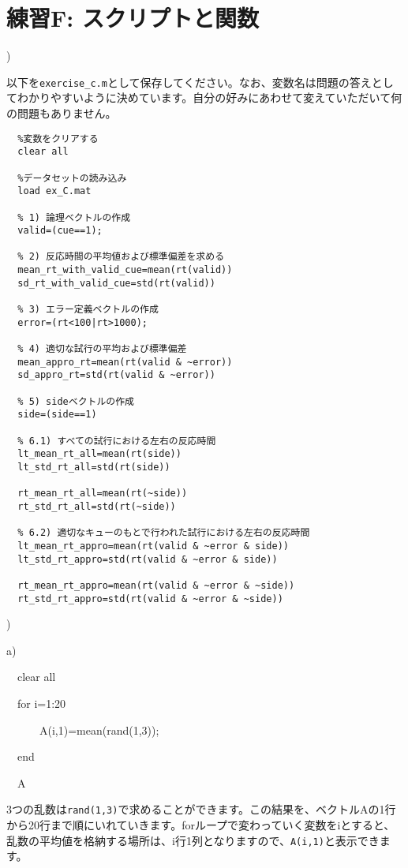 \documentclass{jsarticle}
\begin{document}
\section{練習F: スクリプトと関数}

)

\begin{screen}
以下を{\tt exercise\_c.m}として保存してください。なお、変数名は問題の答えとしてわかりやすいように決めています。自分の好みにあわせて変えていただいて何の問題もありません。
\end{screen}

\begin{verbatim}
  %変数をクリアする
  clear all

  %データセットの読み込み
  load ex_C.mat

  % 1) 論理ベクトルの作成
  valid=(cue==1);

  % 2) 反応時間の平均値および標準偏差を求める
  mean_rt_with_valid_cue=mean(rt(valid))
  sd_rt_with_valid_cue=std(rt(valid))

  % 3) エラー定義ベクトルの作成
  error=(rt<100|rt>1000);

  % 4) 適切な試行の平均および標準偏差
  mean_appro_rt=mean(rt(valid & ~error))
  sd_appro_rt=std(rt(valid & ~error))

  % 5) sideベクトルの作成
  side=(side==1)

  % 6.1) すべての試行における左右の反応時間
  lt_mean_rt_all=mean(rt(side))
  lt_std_rt_all=std(rt(side))

  rt_mean_rt_all=mean(rt(~side))
  rt_std_rt_all=std(rt(~side))

  % 6.2) 適切なキューのもとで行われた試行における左右の反応時間
  lt_mean_rt_appro=mean(rt(valid & ~error & side))
  lt_std_rt_appro=std(rt(valid & ~error & side))

  rt_mean_rt_appro=mean(rt(valid & ~error & ~side))
  rt_std_rt_appro=std(rt(valid & ~error & ~side))
\end{verbatim}

\bigskip

)

a) {\tt

\ \ clear all

\ \ for i=1:20

\ \ \ \ \ \ A(i,1)=mean(rand(1,3));

\ \ end

\ \ A
}

\begin{screen}
3つの乱数は{\tt rand(1,3)}で求めることができます。この結果を、ベクトルAの1行から20行まで順にいれていきます。forループで変わっていく変数をiとすると、乱数の平均値を格納する場所は、i行1列となりますので、{\tt A(i,1)}と表示できます。
\end{screen}
\end{document}
